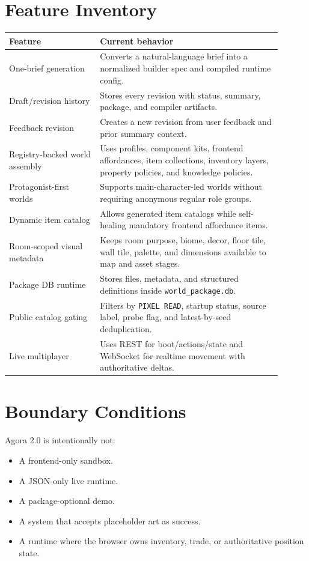 \documentclass[11pt]{article}
\begin{document}
\section{Feature Inventory}

\begin{longtable}{>{\raggedright\arraybackslash}p{0.3\linewidth}>{\raggedright\arraybackslash}p{0.6\linewidth}}
\textbf{Feature} & \textbf{Current behavior} \\
\hline
One-brief generation & Converts a natural-language brief into a normalized builder spec and compiled runtime config. \\
Draft/revision history & Stores every revision with status, summary, package, and compiler artifacts. \\
Feedback revision & Creates a new revision from user feedback and prior summary context. \\
Registry-backed world assembly & Uses profiles, component kits, frontend affordances, item collections, inventory layers, property policies, and knowledge policies. \\
Protagonist-first worlds & Supports main-character-led worlds without requiring anonymous regular role groups. \\
Dynamic item catalog & Allows generated item catalogs while self-healing mandatory frontend affordance items. \\
Room-scoped visual metadata & Keeps room purpose, biome, decor, floor tile, wall tile, palette, and dimensions available to map and asset stages. \\
Package DB runtime & Stores files, metadata, and structured definitions inside \texttt{world\_package.db}. \\
Public catalog gating & Filters by \texttt{PIXEL READ}, startup status, source label, probe flag, and latest-by-seed deduplication. \\
Live multiplayer & Uses REST for boot/actions/state and WebSocket for realtime movement with authoritative deltas. \\
\end{longtable}

\section{Boundary Conditions}

Agora 2.0 is intentionally not:

\begin{itemize}
  \item A frontend-only sandbox.
  \item A JSON-only live runtime.
  \item A package-optional demo.
  \item A system that accepts placeholder art as success.
  \item A runtime where the browser owns inventory, trade, or authoritative position state.
\end{itemize}
\end{document}
